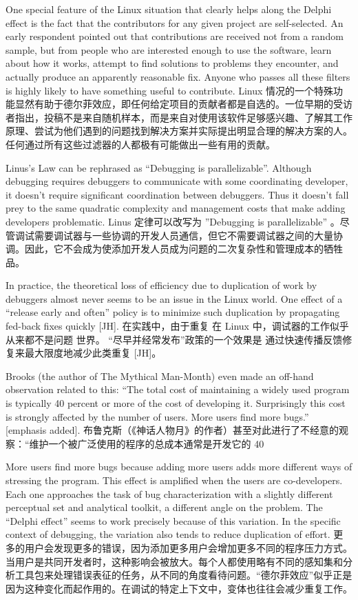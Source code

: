 \documentclass[a4paper,12pt,UTF8,twoside]{ctexbook}
\begin{document}
One special feature of the Linux situation that clearly helps along the Delphi effect is the fact that the contributors for any given project are self-selected. An early respondent pointed out that contributions are received not from a random sample, but from people who are interested enough to use the software, learn about how it works, attempt to find solutions to problems they encounter, and actually produce an apparently reasonable fix. Anyone who passes all these filters is highly likely to have something useful to contribute.
Linux 情况的一个特殊功能显然有助于德尔菲效应，即任何给定项目的贡献者都是自选的。一位早期的受访者指出，投稿不是来自随机样本，而是来自对使用该软件足够感兴趣、了解其工作原理、尝试为他们遇到的问题找到解决方案并实际提出明显合理的解决方案的人。任何通过所有这些过滤器的人都极有可能做出一些有用的贡献。

Linus's Law can be rephrased as ``Debugging is parallelizable''. Although debugging requires debuggers to communicate with some coordinating developer, it doesn't require significant coordination between debuggers. Thus it doesn't fall prey to the same quadratic complexity and management costs that make adding developers problematic.
Linus 定律可以改写为 ''Debugging is parallelizable'' 。尽管调试需要调试器与一些协调的开发人员通信，但它不需要调试器之间的大量协调。因此，它不会成为使添加开发人员成为问题的二次复杂性和管理成本的牺牲品。

In practice, the theoretical loss of efficiency due to duplication of work by debuggers almost never seems to be an issue in the Linux world. One effect of a ``release early and often'' policy is to minimize such duplication by propagating fed-back fixes quickly [JH].
在实践中，由于重复 在 Linux 中，调试器的工作似乎从来都不是问题 世界。 “尽早并经常发布”政策的一个效果是 通过快速传播反馈修复来最大限度地减少此类重复 [JH]。

Brooks (the author of The Mythical Man-Month) even made an off-hand observation related to this: ``The total cost of maintaining a widely used program is typically 40 percent or more of the cost of developing it. Surprisingly this cost is strongly affected by the number of users. More users find more bugs.'' [emphasis added].
布鲁克斯（《神话人物月》的作者）甚至对此进行了不经意的观察：“维护一个被广泛使用的程序的总成本通常是开发它的 40%

More users find more bugs because adding more users adds more different ways of stressing the program. This effect is amplified when the users are co-developers. Each one approaches the task of bug characterization with a slightly different perceptual set and analytical toolkit, a different angle on the problem. The ``Delphi effect'' seems to work precisely because of this variation. In the specific context of debugging, the variation also tends to reduce duplication of effort.
更多的用户会发现更多的错误，因为添加更多用户会增加更多不同的程序压力方式。当用户是共同开发者时，这种影响会被放大。每个人都使用略有不同的感知集和分析工具包来处理错误表征的任务，从不同的角度看待问题。“德尔菲效应”似乎正是因为这种变化而起作用的。在调试的特定上下文中，变体也往往会减少重复工作。
\end{document}
